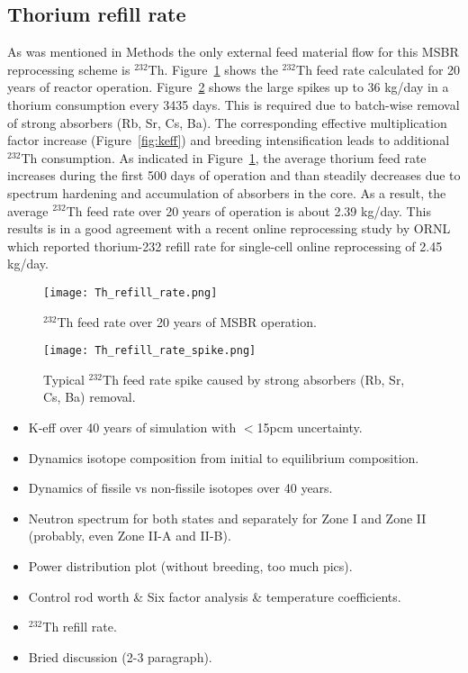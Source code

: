 \subsection{Thorium refill rate}
As was mentioned in Methods the only external feed material flow for this \gls{MSBR} reprocessing scheme is $^{232}$Th. Figure~\ref{fig:th_refill} shows the $^{232}$Th feed rate calculated for 20 years of reactor operation. Figure~\ref{fig:th_refill_spike} shows the large spikes up to 36 kg/day in a thorium consumption every 3435 days. This is required due to batch-wise removal of strong absorbers (Rb, Sr, Cs, Ba). The corresponding effective multiplication factor increase (Figure~\ref{fig:keff}) and breeding intensification leads to additional $^{232}$Th consumption. As indicated in Figure~\ref{fig:th_refill}, the average thorium feed rate increases during the first 500 days of operation and than steadily decreases due to spectrum hardening and accumulation of absorbers in the core. As a result, the average $^{232}$Th feed rate over 20 years of operation is about 2.39 kg/day. This results is in a good agreement with a recent online reprocessing study by \gls{ORNL} \cite{betzler_molten_2017} which reported thorium-232 refill rate for single-cell online reprocessing of 2.45 kg/day.

\begin{figure}[htp!] %
  \centering
  \texttt{[image: Th\_refill\_rate.png]} 
  \caption{$^{232}$Th feed rate over 20 years of \gls{MSBR} operation.}
  \label{fig:th_refill}
\end{figure}
\begin{figure}[htp!] %
  \centering
  \texttt{[image: Th\_refill\_rate\_spike.png]} 
  \caption{Typical $^{232}$Th feed rate spike caused by strong absorbers (Rb, Sr, Cs, Ba) removal.}
  \label{fig:th_refill_spike}
\end{figure}
\FloatBarrier

\begin{itemize}
  \item K-eff over 40 years of simulation with $<$15pcm uncertainty.
  \item Dynamics isotope composition from initial to equilibrium composition.
  \item Dynamics of fissile vs non-fissile isotopes over 40 years.
  \item Neutron spectrum for both states and separately for Zone I and Zone II (probably, even Zone II-A and II-B).
  \item Power distribution plot (without breeding, too much pics).
  \item Control rod worth \& Six factor analysis \& temperature coefficients.
  \item $^{232}$Th refill rate.
  \item Bried discussion (2-3 paragraph).
\end{itemize}
